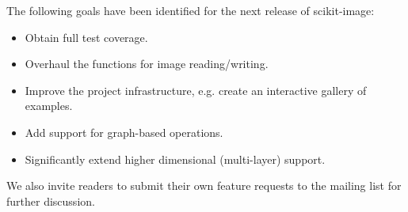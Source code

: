   The following goals have been identified for the next release of scikit-image:

  \begin{itemize}
    \item Obtain full test coverage.
    \item Overhaul the functions for image reading/writing.
    \item Improve the project infrastructure, e.g. create an interactive
          gallery of examples.
    \item Add support for graph-based operations.
    \item Significantly extend higher dimensional (multi-layer) support.
  \end{itemize}

We also invite readers to submit their own feature requests to the mailing list
for further discussion.
